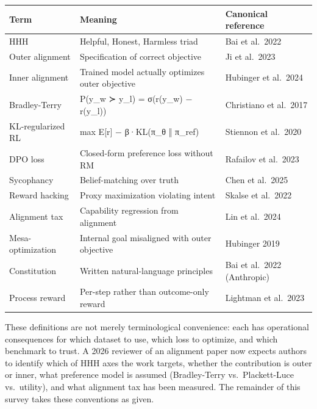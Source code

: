 {\def\LTcaptype{none} %
\begin{longtable}[]{@{}
  >{\raggedright\arraybackslash}p{}
  >{\raggedright\arraybackslash}p{}
  >{\raggedright\arraybackslash}p{}@{}}
\toprule\noalign{}
\begin{minipage}[b]{\linewidth}\raggedright
Term
\end{minipage} & \begin{minipage}[b]{\linewidth}\raggedright
Meaning
\end{minipage} & \begin{minipage}[b]{\linewidth}\raggedright
Canonical reference
\end{minipage} \\
\midrule\noalign{}
\endhead
\bottomrule\noalign{}
\endlastfoot
HHH & Helpful, Honest, Harmless triad & Bai et al.~2022 \\
Outer alignment & Specification of correct objective & Ji et al.~2023 \\
Inner alignment & Trained model actually optimizes outer objective & Hubinger et al.~2024 \\
Bradley-Terry & P(y\_w ≻ y\_l) = σ(r(y\_w) − r(y\_l)) & Christiano et al.~2017 \\
KL-regularized RL & max E{[}r{]} − β·KL(π\_θ ‖ π\_ref) & Stiennon et al.~2020 \\
DPO loss & Closed-form preference loss without RM & Rafailov et al.~2023 \\
Sycophancy & Belief-matching over truth & Chen et al.~2025 \\
Reward hacking & Proxy maximization violating intent & Skalse et al.~2022 \\
Alignment tax & Capability regression from alignment & Lin et al.~2024 \\
Mesa-optimization & Internal goal misaligned with outer objective & Hubinger 2019 \\
Constitution & Written natural-language principles & Bai et al.~2022 (Anthropic) \\
Process reward & Per-step rather than outcome-only reward & Lightman et al.~2023 \\
\end{longtable}
}

These definitions are not merely terminological convenience: each has operational consequences for which dataset to use, which loss to optimize, and which benchmark to trust. A 2026 reviewer of an alignment paper now expects authors to identify which of HHH axes the work targets, whether the contribution is outer or inner, what preference model is assumed (Bradley-Terry vs.~Plackett-Luce vs.~utility), and what alignment tax has been measured. The remainder of this survey takes these conventions as given.


